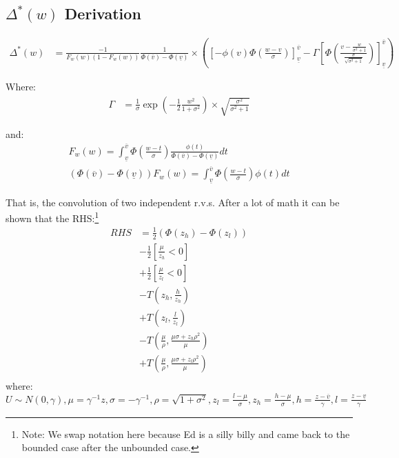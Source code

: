 \documentclass{article}
\begin{document}
\subsection*{$\Delta^*(w)$ Derivation}

\begin{align*}
    \Delta^*(w) &= \frac{-1}{F_w(w)(1 - F_w(w))} \frac{1}{\Phi(\overline{v}) - \Phi(\underline{v})} \times \left(
        \left[ -\phi(v)\Phi\left(\frac{w - v}{\sigma}\right)\right]^{\overline{v}}_{\underline{v}} 
        - \Gamma \left[
            \Phi\left(
                \frac{v - \frac{w}{\sigma^2 + 1}}{\frac{\sigma}{\sqrt{ \sigma^2 + 1}}}
            \right)
        \right]^{\overline{v}}_{\underline{v}}
    \right)
\end{align*}

Where:
\begin{align*}
    \Gamma &= \frac{1}{\sigma}\exp\left(
        -\frac{1}{2} \frac{w^2}{1 + \sigma^2}
    \right) \times \sqrt{\frac{\sigma^2}{\sigma^2 + 1}}
\end{align*}

and:
\begin{align*}
    F_w(w) = \int^{\overline{v}}_{\underline{v}} \Phi \left(
        \frac{w - t}{\sigma}
    \right) \frac{\phi(t)}{\Phi(\overline{v}) - \Phi(\underline{v})} dt  \\
    (\Phi(\overline{v}) - \Phi(\underline{v}))F_w(w) = \int^{\overline{v}}_{\underline{v}} \Phi \left(
        \frac{w - t}{\sigma}
    \right) \phi(t) dt 
\end{align*}

That is, the convolution of two independent r.v.s. After a lot of math it can be shown that the RHS:\footnote{Note: We swap notation here because Ed is a silly billy and came back to the 
bounded case after the unbounded case.}
\begin{align*}
    RHS &= \frac{1}{2} \left(
        \Phi(z_h) - \Phi(z_l)
    \right)  \\
    &- \frac{1}{2} \left[
        \frac{\mu}{z_h} < 0
    \right] \\
    &+ \frac{1}{2} \left[
        \frac{\mu}{z_l} < 0
    \right] \\
    &- T\left(z_h, \frac{h}{z_h}\right) \\
    &+ T\left(z_l, \frac{l}{z_l}\right) \\
    &- T\left(\frac{\mu}{\rho}, \frac{
        \mu\sigma + z_h \rho^2
    }{
        \mu
    }\right) \\
    &+ T\left(\frac{\mu}{\rho}, \frac{
        \mu\sigma + z_l \rho^2
    }{
        \mu
    }\right) \\
\end{align*}
where: $U \sim N(0, \gamma), \mu = \gamma^{-1}z, \sigma = -\gamma^{-1}, \rho = \sqrt{1 + \sigma^2}, z_l = \frac{l - \mu}{\sigma}, z_h = \frac{h-\mu}{\sigma}, 
h = \frac{z - \overline{v}}{\gamma}, l = \frac{z - \underline{v}}{\gamma}$
\end{document}
